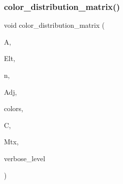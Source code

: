\mbox{\label{action__global_8_c_a165e36cab3cb790e5fc45b572ee4882e}} 
\subsubsection{\texorpdfstring{color\+\_\+distribution\+\_\+matrix()}{color\_distribution\_matrix()}}
{\footnotesize\ttfamily void color\+\_\+distribution\+\_\+matrix (\begin{DoxyParamCaption}\item[{\mbox{\hyperlink{classaction}{action}} $\ast$}]{A,  }\item[{\mbox{\hyperlink{galois_8h_a09fddde158a3a20bd2dcadb609de11dc}{I\+NT}} $\ast$}]{Elt,  }\item[{\mbox{\hyperlink{galois_8h_a09fddde158a3a20bd2dcadb609de11dc}{I\+NT}}}]{n,  }\item[{\mbox{\hyperlink{galois_8h_a122c4acf389c050379f00341fdcd5812}{U\+B\+Y\+TE}} $\ast$}]{Adj,  }\item[{\mbox{\hyperlink{galois_8h_a09fddde158a3a20bd2dcadb609de11dc}{I\+NT}} $\ast$}]{colors,  }\item[{\mbox{\hyperlink{classclassify}{classify}} $\ast$}]{C,  }\item[{\mbox{\hyperlink{galois_8h_a09fddde158a3a20bd2dcadb609de11dc}{I\+NT}} $\ast$\&}]{Mtx,  }\item[{\mbox{\hyperlink{galois_8h_a09fddde158a3a20bd2dcadb609de11dc}{I\+NT}}}]{verbose\+\_\+level }\end{DoxyParamCaption})}

\mbox{\label{action__global_8_c_ade35418331122426d1351b654f478ccd}} 
